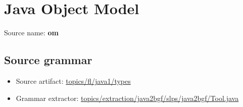 \chapter{Java Object Model}

 Source name: \textbf{om}

\section{Source grammar}

\begin{itemize}
\item Source artifact: \href{http://github.com/grammarware/slps/blob/master/topics/fl/java1/types}{topics/fl/java1/types}
\item Grammar extractor: \href{http://github.com/grammarware/slps/blob/master/topics/extraction/java2bgf/slps/java2bgf/Tool.java}{topics/extraction/java2bgf/slps/java2bgf/Tool.java}
\end{itemize}

